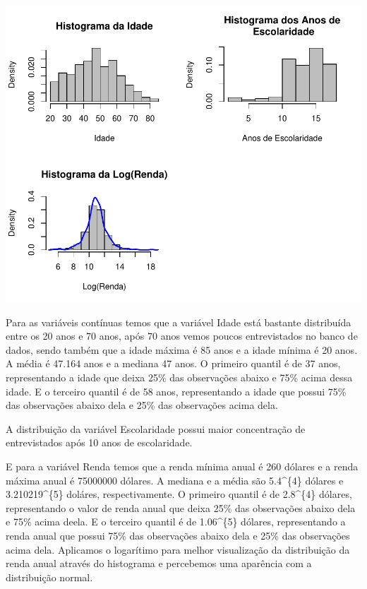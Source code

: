 \documentclass[]{article}
\begin{document}
\begin{flushleft}\includegraphics{Relatorio_IC_files/figure-latex/unnamed-chunk-7-1} \end{flushleft}

Para as variáveis contínuas temos que a variável Idade está bastante
distribuída entre os 20 anos e 70 anos, após 70 anos vemos poucos
entrevistados no banco de dados, sendo também que a idade máxima é 85
anos e a idade mínima é 20 anos. A média é 47.164 anos e a mediana 47
anos. O primeiro quantil é de 37 anos, representando a idade que deixa
25\% das observações abaixo e 75\% acima dessa idade. E o terceiro
quantil é de 58 anos, representando a idade que possui 75\% das
observações abaixo dela e 25\% das observações acima dela.

A distribuição da variável Escolaridade possui maior concentração de
entrevistados após 10 anos de escolaridade.

E para a variável Renda temos que a renda mínima anual é 260 dólares e a
renda máxima anual é 75000000 dólares. A mediana e a média são
5.4\^{}\{4\} dólares e 3.210219\^{}\{5\} doláres,
respectivamente. O primeiro quantil é de 2.8\^{}\{4\} dólares,
representando o valor de renda anual que deixa 25\% das observações
abaixo dela e 75\% acima deela. E o terceiro quantil é de
1.06\^{}\{5\} dólares, representando a renda anual que possui
75\% das observações abaixo dela e 25\% das observações acima dela.
Aplicamos o logarítimo para melhor visualização da distribuição da renda
anual através do histograma e percebemos uma aparência com a
distribuição normal.
\end{document}
